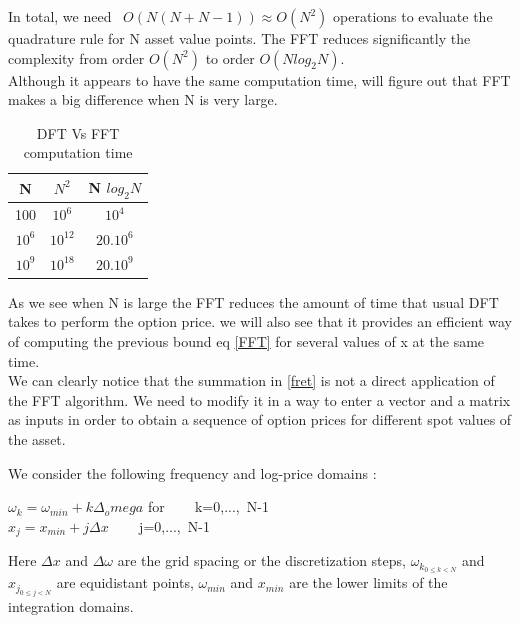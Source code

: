 \documentclass[12pt]{report}
\begin{document}
In total, we need ~$O(N(N+N-1)) \approx O(N^2)$  operations to evaluate the quadrature rule for N asset value points. The FFT reduces significantly the complexity from order $O(N^2)$ to order $O(N log_2N)$.\\
 Although it appears to  have the same computation time, will figure out that FFT makes  a big difference when N is very large.
\begin {table}[h!]
\begin{center}
 \begin{tabular}{||c c c ||} 
 \hline
N & $N^2$ & N $log_2 N$ \\ [0.5ex] 
 \hline\hline
 100 & $10^6$ & $10^4$ \\ 
 \hline
 $10^6$ & $10^{12}$ & $20.10^6$ \\
 \hline
 $10^9$ & $10^{18}$ & $20.10^9$  \\
 \hline
\end{tabular}
\end{center}
\caption {DFT Vs FFT computation time }
\end{table}


 As we see when N is large the FFT reduces the amount of time that usual DFT takes to perform the option price. we will also see that it provides an efficient way of computing the previous bound eq \eqref{FFT} for several values of x at the same time.\\

 We can clearly notice that the summation in \eqref{fret} is not a direct application of the FFT algorithm. We need to modify it in a way to enter a vector and a matrix  as inputs in order to obtain a sequence of option prices for different spot values of the asset. 

We consider the following frequency and log-price domains :
\begin{center}
$\omega_k=\omega_{min}+k\Delta _omega$ for ~~~ k=0,...,~N-1\\
$x_j=x_{min}+j\Delta x$ ~~~ j=0,...,~N-1
\end{center}

Here $\Delta x$ and $\Delta \omega$ are the grid spacing or the discretization steps,    $\omega_{k_{0\leq k <N }}$ and $x_{j_{0\leq j <N }}$ are 
equidistant points, $\omega_{min}$ and $x_{min}$ are the lower limits of the integration domains.\\
\end{document}
